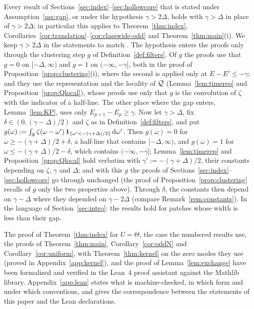 \begin{remark}\label{rem:weaker-gap}
Every result of Sections~\ref{sec:index}--\ref{sec:hollowcore} that is stated under Assumption~\ref{ass:gap}, or under
the hypothesis $\gamma>2\Delta$, holds with $\gamma>\Delta$ in place of $\gamma>2\Delta$; in particular this applies to
Theorem~\ref{thm:index}, Corollaries~\ref{cor:translation}--\ref{cor:classwide-odd} and Theorem~\ref{thm:main}(i). We keep
$\gamma>2\Delta$ in the statements to match \cite[Assumption~1]{BBDF21}. The hypothesis enters the proofs only through the
clustering step $g$ of Definition~\ref{def:filters}. Of $g$ the proofs use that $g=0$ on $[-\Delta,\infty)$ and $g=1$ on
$(-\infty,-\gamma]$, both in the proof of Proposition~\ref{prop:clustering}(i), where the second is applied only at
$E-E'\le-\gamma$; and they use the representation and the locality of $\mathcal{Q}$ (Lemma~\ref{lem:timerep} and
Proposition~\ref{prop:Qlocal}), whose proofs use only that $g$ is the convolution of $\zeta$ with the indicator of a
half-line. The other place where the gap enters, Lemma~\ref{lem:KP}, uses only $E_{p+1}-E_p\ge\gamma$. Now let
$\gamma>\Delta$, fix $\delta\in(0,(\gamma-\Delta)/2)$ and $\zeta$ as in Definition~\ref{def:filters}, and put
$g(\omega):=\int_{\mathbb{R}}\zeta(\omega-\omega')\,\mathbf{1}_{\{\omega'<-(\gamma+\Delta)/2\}}\,\mathrm{d}\omega'$. Then $g(\omega)=0$ for
$\omega\ge-(\gamma+\Delta)/2+\delta$, a half-line that contains $[-\Delta,\infty)$, and $g(\omega)=1$ for
$\omega\le-(\gamma+\Delta)/2-\delta$, which contains $(-\infty,-\gamma]$; Lemma~\ref{lem:timerep} and
Proposition~\ref{prop:Qlocal} hold verbatim with $\gamma':=-(\gamma+\Delta)/2$, their constants depending on $\zeta$,
$\gamma$ and $\Delta$; and with this $g$ the proofs of Sections~\ref{sec:index}--\ref{sec:hollowcore} go through
unchanged (the proof of Proposition~\ref{prop:clustering} recalls of $g$ only the two properties above). Through $\delta$, the constants then depend on $\gamma-\Delta$ where they depended on $\gamma-2\Delta$
(compare Remark~\ref{rem:constants}). In the language of Section~\ref{sec:intro}: the results hold for patches whose
width is less than their gap.
\end{remark}

\begin{remark}\label{rem:lean}
The proof of Theorem~\ref{thm:index} for $U=\Theta$, the case the numbered results use, the proofs of Theorem~\ref{thm:main},
Corollary~\ref{cor:oddN} and Corollary~\ref{cor:uniform}, with Theorem~\ref{thm:kernel} on the zero modes they use (proved in Appendix~\ref{app:kernel}), and the proof
of Lemma~\ref{lem:exchange} have been formalized and verified in the Lean~4 proof assistant against the Mathlib
library. Appendix~\ref{app:lean} states what is machine-checked,
in which form and under which conventions, and gives the correspondence between the statements of this paper and the Lean
declarations.
\end{remark}


